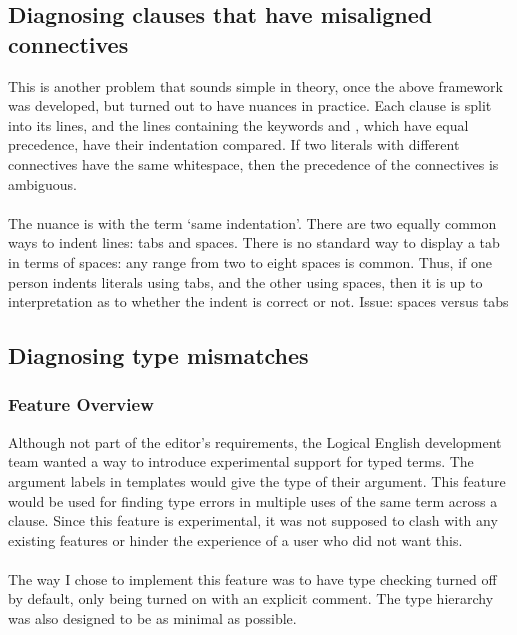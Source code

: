 \documentclass[../main.tex]{subfiles}
\begin{document}
\subsection{Diagnosing clauses that have misaligned connectives}
This is another problem that sounds simple in theory, once the above framework was developed, but turned out to have nuances in practice. Each clause is split into its lines, and the lines containing the keywords  and , which have equal precedence, have their indentation compared. If two literals with different connectives have the same whitespace, then the precedence of the connectives is ambiguous.
\\
\\
The nuance is with the term `same indentation'. There are two equally common ways to indent lines: tabs and spaces. There is no standard way to display a tab in terms of spaces: any range from two to eight spaces is common. Thus, if one person indents literals using tabs, and the other using spaces, then it is up to interpretation as to whether the indent is correct or not.
Issue: spaces versus tabs

\subsection{Diagnosing type mismatches}

\subsubsection{Feature Overview}
Although not part of the editor's requirements, the Logical English development team wanted a way to introduce experimental support for typed terms. The argument labels in templates would give the type of their argument. This feature would be used for finding type errors in multiple uses of the same term across a clause. Since this feature is experimental, it was not supposed to clash with any existing features or hinder the experience of a user who did not want this.
\\
\\
The way I chose to implement this feature was to have type checking turned off by default, only being turned on with an explicit  comment. The type hierarchy was also designed to be as minimal as possible. 
\end{document}
